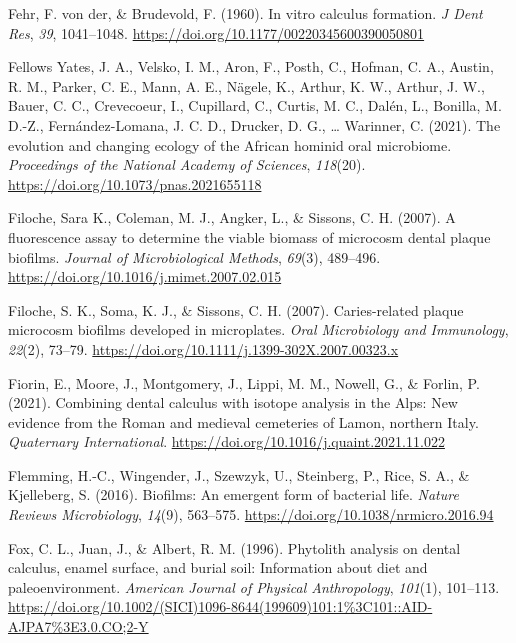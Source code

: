 \documentclass[
  letterpaper,
]{book}
\newlength{\cslhangindent}
\newlength{\cslentryspacingunit} %
\newenvironment{CSLReferences}[2] %
 {%
  \setlength{\parindent}{0pt}
  \ifodd #1
  \let\oldpar\par
  \def\par{\hangindent=\cslhangindent\oldpar}
  \fi
  \setlength{\parskip}{#2\cslentryspacingunit}
 }%
 {}
\begin{document}
\begin{CSLReferences}{1}{0}
\leavevmode{}%
Fehr, F. von der, \& Brudevold, F. (1960). In vitro calculus formation.
\emph{J Dent Res}, \emph{39}, 1041--1048.
\url{https://doi.org/10.1177/00220345600390050801}

\leavevmode{}%
Fellows Yates, J. A., Velsko, I. M., Aron, F., Posth, C., Hofman, C. A.,
Austin, R. M., Parker, C. E., Mann, A. E., Nägele, K., Arthur, K. W.,
Arthur, J. W., Bauer, C. C., Crevecoeur, I., Cupillard, C., Curtis, M.
C., Dalén, L., Bonilla, M. D.-Z., Fernández-Lomana, J. C. D., Drucker,
D. G., \ldots{} Warinner, C. (2021). The evolution and changing ecology
of the {African} hominid oral microbiome. \emph{Proceedings of the
National Academy of Sciences}, \emph{118}(20).
\url{https://doi.org/10.1073/pnas.2021655118}

\leavevmode{}%
Filoche, Sara K., Coleman, M. J., Angker, L., \& Sissons, C. H. (2007).
A fluorescence assay to determine the viable biomass of microcosm dental
plaque biofilms. \emph{Journal of Microbiological Methods},
\emph{69}(3), 489--496.
\url{https://doi.org/10.1016/j.mimet.2007.02.015}

\leavevmode{}%
Filoche, S. K., Soma, K. J., \& Sissons, C. H. (2007). Caries-related
plaque microcosm biofilms developed in microplates. \emph{Oral
Microbiology and Immunology}, \emph{22}(2), 73--79.
\url{https://doi.org/10.1111/j.1399-302X.2007.00323.x}

\leavevmode{}%
Fiorin, E., Moore, J., Montgomery, J., Lippi, M. M., Nowell, G., \&
Forlin, P. (2021). Combining dental calculus with isotope analysis in
the {Alps}: {New} evidence from the {Roman} and medieval cemeteries of
{Lamon}, northern {Italy}. \emph{Quaternary International}.
\url{https://doi.org/10.1016/j.quaint.2021.11.022}

\leavevmode{}%
Flemming, H.-C., Wingender, J., Szewzyk, U., Steinberg, P., Rice, S. A.,
\& Kjelleberg, S. (2016). Biofilms: An emergent form of bacterial life.
\emph{Nature Reviews Microbiology}, \emph{14}(9), 563--575.
\url{https://doi.org/10.1038/nrmicro.2016.94}

\leavevmode{}%
Fox, C. L., Juan, J., \& Albert, R. M. (1996). Phytolith analysis on
dental calculus, enamel surface, and burial soil: {Information} about
diet and paleoenvironment. \emph{American Journal of Physical
Anthropology}, \emph{101}(1), 101--113.
\url{https://doi.org/10.1002/(SICI)1096-8644(199609)101:1\%3C101::AID-AJPA7\%3E3.0.CO;2-Y}


\end{CSLReferences}
\end{document}
